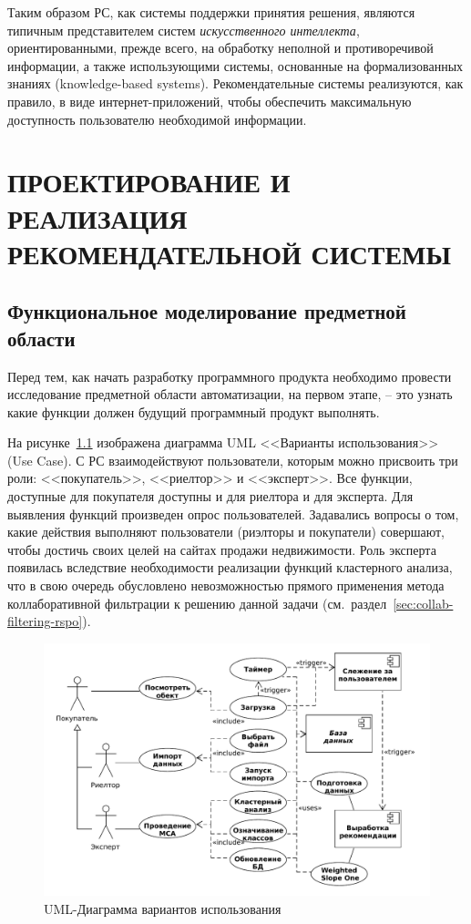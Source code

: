 \documentclass[a4paper,14pt,openany,final]{extreport} %
\begin{document}
Таким образом РС, как системы поддержки принятия решения, являются типичным представителем систем \emph{искусственного интеллекта}, ориентированными, прежде всего, на обработку неполной и противоречивой информации, а также использующими системы, основанные на формализованных знаниях (\foreignlanguage{english}{knowledge-based systems}). Рекомендательные системы реализуются, как правило, в виде интернет-приложений, чтобы обеспечить максимальную доступность пользователю необходимой информации.

\chapter{ПРОЕКТИРОВАНИЕ И РЕАЛИЗАЦИЯ РЕКОМЕНДАТЕЛЬНОЙ СИСТЕМЫ}
\label{chap:dev-tech-theory}
\section{Функциональное моделирование предметной области}

Перед тем, как начать разработку программного продукта необходимо провести исследование предметной области автоматизации, на первом этапе, -- это узнать какие функции должен будущий программный продукт выполнять.

На рисунке~\ref{fig:umlusecase} изображена диаграмма UML <<Варианты использования>> (Use Case).  С РС взаимодействуют пользователи, которым можно присвоить три роли: <<покупатель>>, <<риелтор>> и <<эксперт>>. Все функции, доступные для покупателя доступны и для риелтора и для эксперта. Для выявления функций произведен опрос пользователей.  Задавались вопросы о том, какие действия выполняют пользователи (риэлторы и покупатели) совершают, чтобы достичь своих целей на сайтах продажи недвижимости. Роль эксперта появилась вследствие необходимости реализации функций кластерного анализа, что в свою очередь обусловлено невозможностью прямого применения метода коллаборативной фильтрации к решению данной задачи (см.~раздел~\ref{sec:collab-filtering-rspo}).

\begin{figure}[htbp]
  \centering
  \includegraphics[width=0.9\linewidth]{use_case.pdf}
  \caption{UML-Диаграмма вариантов использования}
  \label{fig:umlusecase}
\end{figure}
\end{document}
